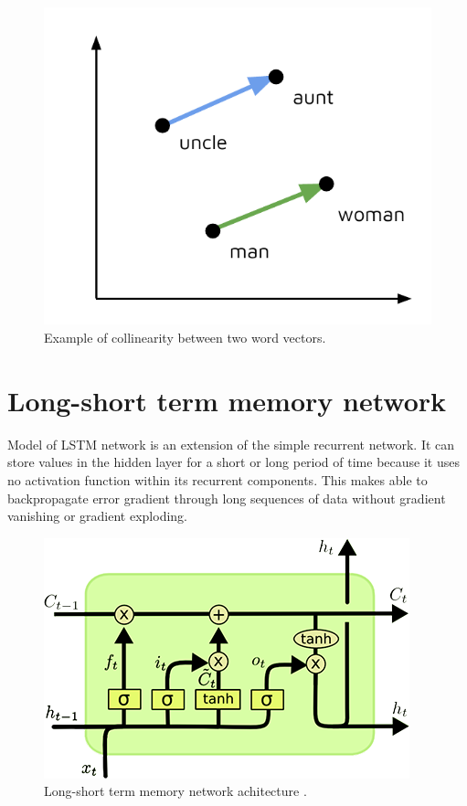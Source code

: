 \begin{figure}
\centering
\includegraphics{Figures/word_embeddings}
\decoRule
\caption[Word vectors]{Example of collinearity between two word vectors.}
\label{fig:word_embeddings}
\end{figure}

\section{Long-short term memory network}
Model of LSTM network is an extension of the simple recurrent network. It can store values in the hidden layer for a short or long period of time because it uses no activation function within its recurrent components. This makes able to backpropagate error gradient through long sequences of data without gradient vanishing or gradient exploding.

\begin{figure}
\centering
\includegraphics{Figures/lstm}
\decoRule
\caption[Long-short term memory]{Long-short term memory network achitecture \parencite{lstm-picture}.}
\label{fig:word_embeddings}
\end{figure}

